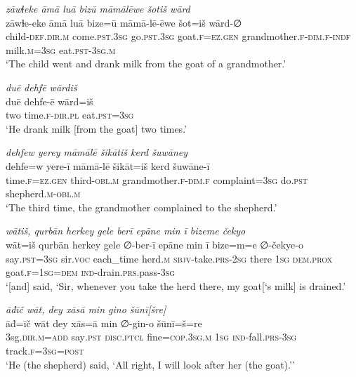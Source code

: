 \ea \label{KŠ.25}
\textit{zāwɫeke āmā luā bizū māmālēwe šotiš wārd} \\ 
\gll zāwɫe-eke āmā luā bize=ū māmā-lē-ēwe šot=iš wārd-∅ \\ 
 child\textsc{-def}\textsc{.dir}\textsc{.m} come\textsc{.pst}\textsc{.3sg} go\textsc{.pst}\textsc{.3sg} goat\textsc{.f}\textsc{=ez.gen} grandmother\textsc{.f}\textsc{-dim}\textsc{.f}\textsc{-indf} milk\textsc{.m}\textsc{=3sg} eat\textsc{.pst}\textsc{-3sg}\textsc{.m} \\ 
\glt `The child went and drank milk from the goat of a grandmother.'
\z 
 
\ea \label{KŠ.26}
\textit{duē dehfē wārdiš} \\ 
\gll duē dehfe-ē wārd=iš \\ 
 two time\textsc{.f}\textsc{-dir}\textsc{.pl} eat\textsc{.pst}\textsc{=3sg} \\ 
\glt `He drank milk [from the goat] two times.'
\z 
 
\ea \label{KŠ.27}
\textit{dehfew yerey māmālē šikātiš kerd šuwāney} \\ 
\gll dehfe=w yere-ī māmā-lē šikāt=iš kerd šuwāne-ī \\ 
 time\textsc{.f}\textsc{=ez.gen} third\textsc{-obl}\textsc{.m} grandmother\textsc{.f}\textsc{-dim}\textsc{.f} complaint\textsc{=3sg} do\textsc{.pst} shepherd\textsc{.m}\textsc{-obl}\textsc{.m} \\ 
\glt `The third time, the grandmother complained to the shepherd.'
\z 
 
\ea \label{KŠ.28}
\textit{wātiš, qurbān herkey gele berī epāne min ī bizeme čekyo} \\ 
\gll wāt=iš qurbān herkey gele ∅-ber-ī epāne min ī bize=m=e ∅-čekye-o \\ 
 say\textsc{.pst}\textsc{=3sg} sir.\textsc{voc} each\_time herd\textsc{.m} \textsc{sbjv-}take\textsc{.prs}-\textsc{2sg} there \textsc{1sg} \textsc{dem.prox} goat\textsc{.f}\textsc{=\textsc{1sg}}\textsc{=dem} \textsc{ind-}drain\textsc{.prs}.pass\textsc{-3sg} \\ 
\glt `[and] said, ‘Sir, whenever you take the herd there, my goat[‘s milk] is drained.'
\z 
 
\ea \label{KŠ.29}
\textit{āđīč wāt, dey xāsā min gino šūnī[šre]} \\ 
\gll āđ=īč wāt dey xās=ā min ∅-gin-o šūnī=š=re \\ 
 3sg\textsc{.dir}\textsc{.m}\textsc{=add} say\textsc{.pst} \textsc{disc.ptcl} fine\textsc{=cop}\textsc{.3sg}\textsc{.m} \textsc{1sg} \textsc{ind-}fall\textsc{.prs}\textsc{-3sg} track\textsc{.f}\textsc{=3sg}\textsc{=\textsc{post}} \\ 
\glt `He (the shepherd) said, ‘All right, I will look after her (the goat).’'
\z 
 

